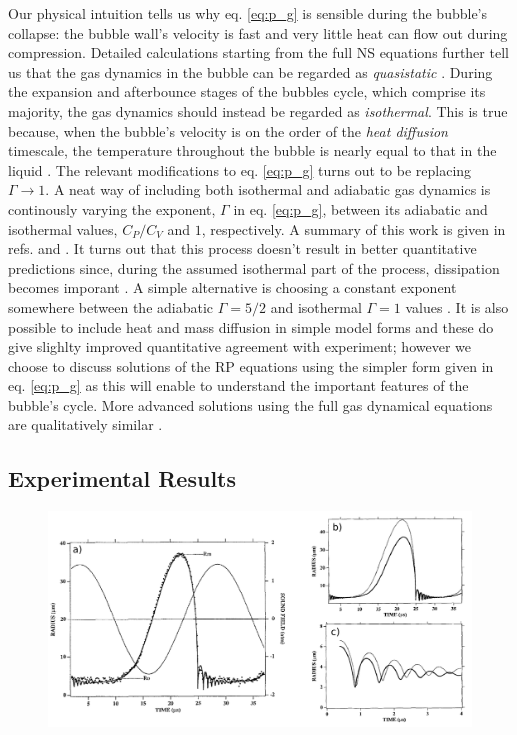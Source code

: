 \documentclass[rmp,aps,nofootinbib,superscriptaddress,floatfix]{revtex4-2}
\begin{document}
Our physical intuition tells us why eq. \ref{eq:p_g} is sensible during the bubble's collapse: the bubble wall's velocity is fast and very little heat can flow out during compression. Detailed calculations starting from the full NS equations further tell us that the gas dynamics in the bubble can be regarded as \emph{quasistatic} \cite{}. During the expansion and afterbounce stages of the bubbles cycle, which comprise its majority, the gas dynamics should instead be regarded as \emph{isothermal}. This is true because, when the bubble's velocity is on the order of the \emph{heat diffusion} timescale, the temperature throughout the bubble is nearly equal to that in the liquid \cite{prosperetti1999old,brenner2002single,yasui2018acoustic}. The relevant modifications to eq. \ref{eq:p_g} turns out to be replacing $\Gamma\rightarrow 1$. A neat way of including both isothermal and adiabatic gas dynamics is continously varying the exponent, $\Gamma$ in eq. \ref{eq:p_g}, between its adiabatic and isothermal values, $C_P/C_V$ and $1$, respectively. A summary of this work is given in refs. \cite{brenner2002single} and \cite{prosperetti1999old}. It turns out that this process doesn't result in better quantitative predictions since, during the assumed isothermal part of the process, dissipation becomes imporant \cite{brenner2002single}. A simple alternative is choosing a constant exponent somewhere between the adiabatic $\Gamma=5/2$ and isothermal $\Gamma=1$ values \cite{hilgenfeldt1999simple}. It is also possible to include heat and mass diffusion in simple model forms and these do give slighlty improved quantitative agreement with experiment; however we choose to discuss solutions of the RP equations using the simpler form given in eq. \ref{eq:p_g} as this will enable to understand the important features of the bubble's cycle. More advanced solutions using the full gas dynamical equations are qualitatively similar \cite{brenner2002single,yasui2018acoustic}.

\subsection{Experimental Results}

\begin{figure}
\includegraphics[width=0.9\linewidth]{figs/bubble_radius_1.pdf}
    \caption{\cite{barber1997defining,barber1992light}}
\label{fig:bubble_radius_1}
\end{figure}
\end{document}
